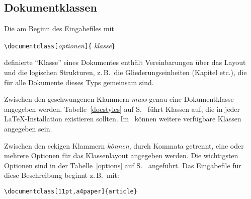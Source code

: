 \subsection{Dokumentklassen}\label{docsty}
 
Die am Beginn des Eingabefiles  mit
\begin{beispiel}
\verb|\documentclass[|\textit{optionen}\verb|]{|%
  \textit{klasse}\verb|}|
\end{beispiel}
definierte "`Klasse"' eines Dokumentes enthält Vereinbarungen über das Layout 
und die logischen Strukturen, z.\,B.\ die Gliederungseinheiten (Kapitel etc.\@), 
die für alle Dokumente dieses Typs gemeinsam sind.

Zwischen den geschwungenen Klammern \emph{muss} genau eine Dokumentklasse
angegeben werden.  Tabelle~\ref{docstyles} auf S.~\pageref{docstyles} führt 
Klassen auf, die in jeder \LaTeX-Installation existieren sollten. Im \local\ 
können weitere verfügbare Klassen angegeben sein.  
 
Zwischen den eckigen Klammern \emph{können}, durch Kommata getrennt, eine oder 
mehrere Optionen für das Klassenlayout angegeben werden. Die wichtigsten 
Optionen sind in der Tabelle~\ref{options} auf S.~\pageref{options} angeführt.
Das Eingabefile für diese Beschreibung beginnt z.\,B.\ mit:
\begin{beispiel}
\verb|\documentclass[11pt,a4paper]{article}|
\end{beispiel}

